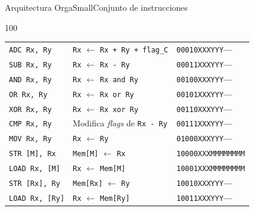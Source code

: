 \documentclass[aspectratio=169]{beamer}
\begin{document}
\begin{frame}[fragile,t]{Arquitectura OrgaSmall}{Conjunto de instrucciones}
\begin{textblock}{100}
\begin{tabular}{l|l|l}
    \texttt{ADC  Rx, Ry}   & \texttt{Rx} $\leftarrow$ \texttt{Rx + Ry + flag\_C}                & \texttt{\textcolor{r}{00010}\textcolor{v}{XXX}\textcolor{verde}{YYY}\textcolor{gray}{-----}} \\  %
    \texttt{SUB  Rx, Ry}   & \texttt{Rx} $\leftarrow$ \texttt{Rx - Ry}                          & \texttt{\textcolor{r}{00011}\textcolor{v}{XXX}\textcolor{verde}{YYY}\textcolor{gray}{-----}} \\  %
    \texttt{AND  Rx, Ry}   & \texttt{Rx} $\leftarrow$ \texttt{Rx and Ry}                        & \texttt{\textcolor{r}{00100}\textcolor{v}{XXX}\textcolor{verde}{YYY}\textcolor{gray}{-----}} \\  %
    \texttt{OR   Rx, Ry}   & \texttt{Rx} $\leftarrow$ \texttt{Rx or Ry}                         & \texttt{\textcolor{r}{00101}\textcolor{v}{XXX}\textcolor{verde}{YYY}\textcolor{gray}{-----}} \\  %
    \texttt{XOR  Rx, Ry}   & \texttt{Rx} $\leftarrow$ \texttt{Rx xor Ry}                        & \texttt{\textcolor{r}{00110}\textcolor{v}{XXX}\textcolor{verde}{YYY}\textcolor{gray}{-----}} \\  %
    \texttt{CMP  Rx, Ry}   & Modifica \emph{flags} de \texttt{Rx - Ry}                          & \texttt{\textcolor{r}{00111}\textcolor{v}{XXX}\textcolor{verde}{YYY}\textcolor{gray}{-----}} \\  %
    \texttt{MOV  Rx, Ry}   & \texttt{Rx} $\leftarrow$ \texttt{Ry}                               & \texttt{\textcolor{r}{01000}\textcolor{v}{XXX}\textcolor{verde}{YYY}\textcolor{gray}{-----}} \\  %
    \hline
    \texttt{STR  [M], Rx}  & \texttt{Mem[M]} $\leftarrow$ \texttt{Rx}                           & \texttt{\textcolor{r}{10000}\textcolor{v}{XXX}\textcolor{a}{MMMMMMMM}} \\  %
    \texttt{LOAD Rx, [M]}  & \texttt{Rx} $\leftarrow$ \texttt{Mem[M]}                           & \texttt{\textcolor{r}{10001}\textcolor{v}{XXX}\textcolor{a}{MMMMMMMM}} \\  %
    \texttt{STR  [Rx], Ry} & \texttt{Mem[Rx]} $\leftarrow$ \texttt{Ry}                          & \texttt{\textcolor{r}{10010}\textcolor{v}{XXX}\textcolor{verde}{YYY}\textcolor{gray}{-----}} \\  %
    \texttt{LOAD Rx, [Ry]} & \texttt{Rx} $\leftarrow$ \texttt{Mem[Ry]}                          & \texttt{\textcolor{r}{10011}\textcolor{v}{XXX}\textcolor{verde}{YYY}\textcolor{gray}{-----}} \\  %
    \hline

\end{tabular}
\end{textblock}
\end{frame}
\end{document}
